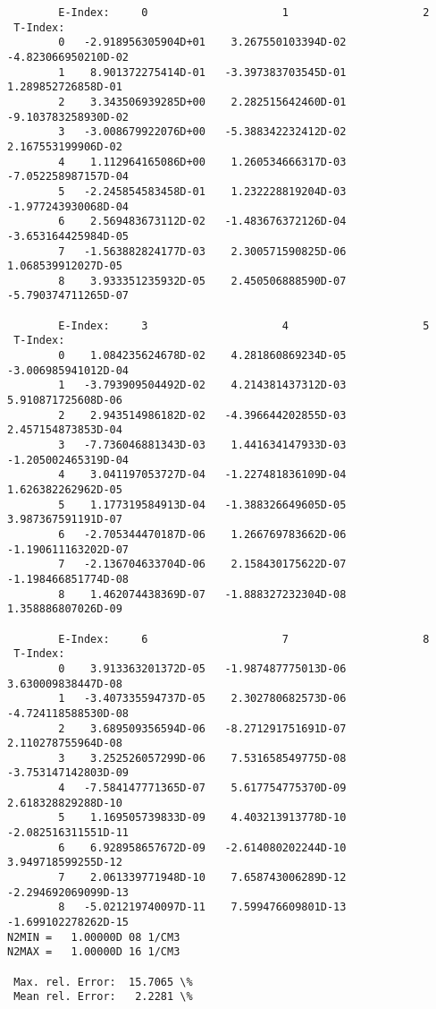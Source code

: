 \documentclass[12pt,dvipdfmx]{article}
\begin{document}
{\begin{small}\begin{verbatim}
        E-Index:     0                     1                     2
 T-Index:
        0   -2.918956305904D+01    3.267550103394D-02   -4.823066950210D-02
        1    8.901372275414D-01   -3.397383703545D-01    1.289852726858D-01
        2    3.343506939285D+00    2.282515642460D-01   -9.103783258930D-02
        3   -3.008679922076D+00   -5.388342232412D-02    2.167553199906D-02
        4    1.112964165086D+00    1.260534666317D-03   -7.052258987157D-04
        5   -2.245854583458D-01    1.232228819204D-03   -1.977243930068D-04
        6    2.569483673112D-02   -1.483676372126D-04   -3.653164425984D-05
        7   -1.563882824177D-03    2.300571590825D-06    1.068539912027D-05
        8    3.933351235932D-05    2.450506888590D-07   -5.790374711265D-07

        E-Index:     3                     4                     5
 T-Index:
        0    1.084235624678D-02    4.281860869234D-05   -3.006985941012D-04
        1   -3.793909504492D-02    4.214381437312D-03    5.910871725608D-06
        2    2.943514986182D-02   -4.396644202855D-03    2.457154873853D-04
        3   -7.736046881343D-03    1.441634147933D-03   -1.205002465319D-04
        4    3.041197053727D-04   -1.227481836109D-04    1.626382262962D-05
        5    1.177319584913D-04   -1.388326649605D-05    3.987367591191D-07
        6   -2.705344470187D-06    1.266769783662D-06   -1.190611163202D-07
        7   -2.136704633704D-06    2.158430175622D-07   -1.198466851774D-08
        8    1.462074438369D-07   -1.888327232304D-08    1.358886807026D-09

        E-Index:     6                     7                     8
 T-Index:
        0    3.913363201372D-05   -1.987487775013D-06    3.630009838447D-08
        1   -3.407335594737D-05    2.302780682573D-06   -4.724118588530D-08
        2    3.689509356594D-06   -8.271291751691D-07    2.110278755964D-08
        3    3.252526057299D-06    7.531658549775D-08   -3.753147142803D-09
        4   -7.584147771365D-07    5.617754775370D-09    2.618328829288D-10
        5    1.169505739833D-09    4.403213913778D-10   -2.082516311551D-11
        6    6.928958657672D-09   -2.614080202244D-10    3.949718599255D-12
        7    2.061339771948D-10    7.658743006289D-12   -2.294692069099D-13
        8   -5.021219740097D-11    7.599476609801D-13   -1.699102278262D-15
N2MIN =   1.00000D 08 1/CM3
N2MAX =   1.00000D 16 1/CM3

 Max. rel. Error:  15.7065 \%
 Mean rel. Error:   2.2281 \%


\end{verbatim}
\end{small}}
\end{document}
